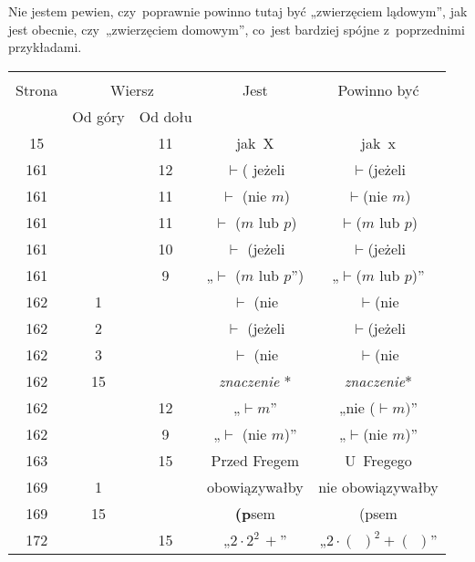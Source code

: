\documentclass[a4paper,11pt]{article}
\begin{document}
\start {} Nie jestem pewien, czy~poprawnie powinno tutaj
być „zwierzęciem lądowym”, jak jest obecnie, czy~„zwierzęciem
domowym”, co~jest bardziej spójne z~poprzednimi przykładami.

\vspace{\spaceFour}





\newpage



\begin{center}

  \begin{tabular}{|c|c|c|c|c|}
    \hline
    & \multicolumn{2}{c|}{} & & \\
    Strona & \multicolumn{2}{c|}{Wiersz} & Jest
                              & Powinno być \\ \cline{2-3}
    & Od góry & Od dołu & & \\
    \hline
    15  & & 11 & jak~X & jak~x \\
    161 & & 12 & $\vdash$({ } jeżeli & $\vdash$(jeżeli \\
    161 & & 11 & $\vdash$ (nie $m$) & $\vdash$(nie $m$) \\
    161 & & 11 & $\vdash$ ($m${ } lub $p$) & $\vdash$($m$ lub $p$) \\
    161 & & 10 & $\vdash$ (jeżeli & $\vdash$(jeżeli \\
    161 & &  9 & „$\vdash$ ($m$ lub $p$”)
           & „$\vdash$($m$ lub $p$)” \\
    162 &  1 & & $\vdash$ (nie & $\vdash$(nie \\
    162 &  2 & & $\vdash$ (jeżeli & $\vdash$(jeżeli \\
    162 &  3 & & $\vdash$ (nie & $\vdash$(nie \\
    162 & 15 & & \textit{znaczenie} * & \textit{znaczenie}* \\
    162 & & 12 & „$\vdash m$” & „nie ($\vdash m)$” \\
    162 & &  9 & „$\vdash$ (nie $m$)” & „$\vdash$(nie $m$)” \\
    163 & & 15 & Przed Fregem & U~Fregego \\
    169 &  1 & & obowiązywałby & nie obowiązywałby \\
    169 & 15 & & \textbf{(p}sem & (psem \\
    172 & & 15 & „$2 \cdot 2^{ 2 } \, +$”
           & „$2 \cdot ( \:\: )^{ 2 } + ( \:\: )$” \\

\end{tabular}
\end{center}
\end{document}
